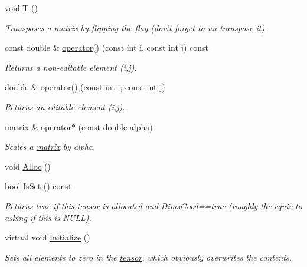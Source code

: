 \begin{DoxyCompactItemize}
void \hyperlink{classJKBuilder_1_1matrix_af2563817f6505e9f8a6ee5c5c209a115}{T} ()
\begin{DoxyCompactList}\small\item\em Transposes a \hyperlink{classJKBuilder_1_1matrix}{matrix} by flipping the flag (don't forget to un-\/transpose it). \item\end{DoxyCompactList}\item 
const double \& \hyperlink{classJKBuilder_1_1matrix_a9ccbac42f4eefb704f04886001f4fb3e}{operator()} (const int i, const int j) const 
\begin{DoxyCompactList}\small\item\em Returns a non-\/editable element (i,j). \item\end{DoxyCompactList}\item 
double \& \hyperlink{classJKBuilder_1_1matrix_a3d7fca183ff1c9f4c160218746f2ef31}{operator()} (const int i, const int j)
\begin{DoxyCompactList}\small\item\em Returns an editable element (i,j). \item\end{DoxyCompactList}\item 
\hyperlink{classJKBuilder_1_1matrix}{matrix} \& \hyperlink{classJKBuilder_1_1matrix_ad4799cbe4a5d07c77f41857a3ce914a2}{operator$\ast$} (const double alpha)
\begin{DoxyCompactList}\small\item\em Scales a \hyperlink{classJKBuilder_1_1matrix}{matrix} by alpha. \item\end{DoxyCompactList}\item 
void \hyperlink{classJKBuilder_1_1tensor_a0ca5cbe96d2a61f06ae4b543ef84f166}{Alloc} ()
\item 
bool \hyperlink{classJKBuilder_1_1tensor_a79c9a36acc5dbeab94033ca97971dc09}{IsSet} () const 
\begin{DoxyCompactList}\small\item\em Returns true if this \hyperlink{classJKBuilder_1_1tensor}{tensor} is allocated and DimsGood==true (roughly the equiv to asking if this is NULL). \item\end{DoxyCompactList}\item 
virtual void \hyperlink{classJKBuilder_1_1tensor_a98b1050f09da390896f964fb7a892391}{Initialize} ()
\begin{DoxyCompactList}\small\item\em Sets all elements to zero in the \hyperlink{classJKBuilder_1_1tensor}{tensor}, which obviously overwrites the contents. \item\end{DoxyCompactList}\item 

\end{DoxyCompactItemize}
